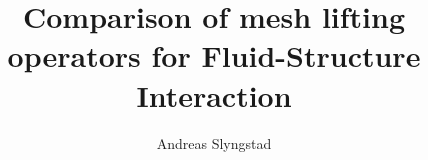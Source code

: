 \documentclass[a4paper, twoside,openright ,titlepage, 12pt]{book}
\title{Comparison of mesh lifting operators for Fluid-Structure Interaction}
\author{Andreas Slyngstad}
\begin{document}
                                                                                                                          
\masterfrontpage

\tableofcontents
\newtheorem{theorem}{Theorem}[section]
\newtheorem{lemma}[theorem]{Lemma}

%
%
%
%
%
%
%




\end{document}
